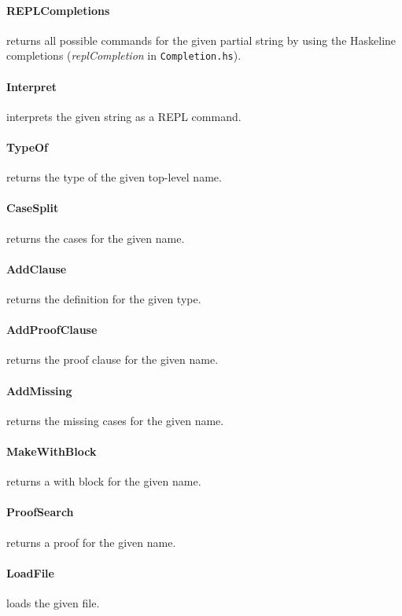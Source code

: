 \documentclass{article}
\begin{document}
\paragraph{REPLCompletions} returns all possible commands for the given partial string by using the Haskeline completions (\emph{replCompletion} in \texttt{Completion.hs}).

\paragraph{Interpret} interprets the given string as a REPL command.

\paragraph{TypeOf} returns the type of the given top-level name.

\paragraph{CaseSplit} returns the cases for the given name.

\paragraph{AddClause} returns the definition for the given type.

\paragraph{AddProofClause} returns the proof clause for the given name.

\paragraph{AddMissing} returns the missing cases for the given name.

\paragraph{MakeWithBlock} returns a with block for the given name.

\paragraph{ProofSearch} returns a proof for the given name.

\paragraph{LoadFile} loads the given file.
\end{document}
